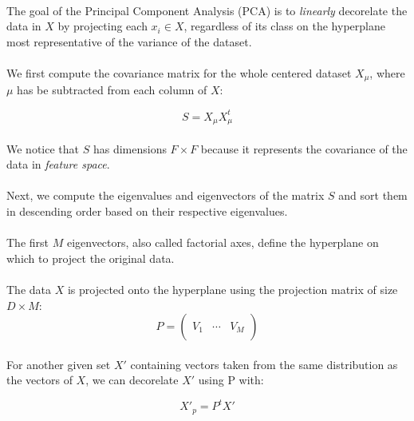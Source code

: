 
\paragraph{}
The goal of the Principal Component Analysis (PCA) is to \emph{linearly} decorelate the data in $X$ by projecting each $x_i \in X$, regardless of its class on the hyperplane most representative of the variance of the dataset.

\paragraph{}
We first compute the covariance matrix for the whole centered dataset $X_\mu$, where $\mu$ has be subtracted from each column of $X$:

$$ S = X_\mu X_\mu ^t$$

\paragraph{}
We notice that $S$ has dimensions $F \times F$ because it represents the covariance of the data in \emph{feature space}.

\paragraph{}
Next, we compute the eigenvalues and eigenvectors of the matrix $S$ and sort them in descending order based on their respective eigenvalues.

\paragraph{}
The first $M$ eigenvectors, also called factorial axes, define the hyperplane on which to project the original data.

\paragraph{}
The data $X$ is projected onto the hyperplane using the projection matrix of size $D \times M$:
$$ P = \left( \begin{array}{ccc}
 &  &  \\
V_1 & \cdots & V_M \\
 &  &  \end{array} \right) $$ 

\paragraph{}
For another given set $X'$ containing vectors taken from the same distribution as the vectors of $X$, we can decorelate $X'$ using P with:

$$ X'_p = P^tX'$$
